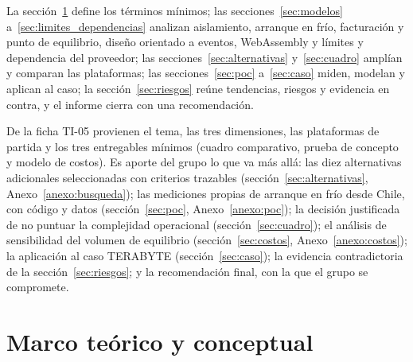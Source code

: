 \documentclass[12pt, letterpaper, table, xcdraw]{inf-pucv}
\begin{document}
La sección~\ref{sec:marco} define los términos mínimos; las secciones~\ref{sec:modelos} a~\ref{sec:limites_dependencias} analizan aislamiento, arranque en frío, facturación y punto de equilibrio, diseño orientado a eventos, WebAssembly y límites y dependencia del proveedor; las secciones~\ref{sec:alternativas} y~\ref{sec:cuadro} amplían y comparan las plataformas; las secciones~\ref{sec:poc} a~\ref{sec:caso} miden, modelan y aplican al caso; la sección~\ref{sec:riesgos} reúne tendencias, riesgos y evidencia en contra, y el informe cierra con una recomendación.

De la ficha TI-05 provienen el tema, las tres dimensiones, las plataformas de partida y los tres entregables mínimos (cuadro comparativo, prueba de concepto y modelo de costos). Es aporte del grupo lo que va más allá: las diez alternativas adicionales seleccionadas con criterios trazables (sección~\ref{sec:alternativas}, Anexo~\ref{anexo:busqueda}); las mediciones propias de arranque en frío desde Chile, con código y datos (sección~\ref{sec:poc}, Anexo~\ref{anexo:poc}); la decisión justificada de no puntuar la complejidad operacional (sección~\ref{sec:cuadro}); el análisis de sensibilidad del volumen de equilibrio (sección~\ref{sec:costos}, Anexo~\ref{anexo:costos}); la aplicación al caso TERABYTE (sección~\ref{sec:caso}); la evidencia contradictoria de la sección~\ref{sec:riesgos}; y la recomendación final, con la que el grupo se compromete.



\section{Marco teórico y conceptual}
\label{sec:marco}
\end{document}
